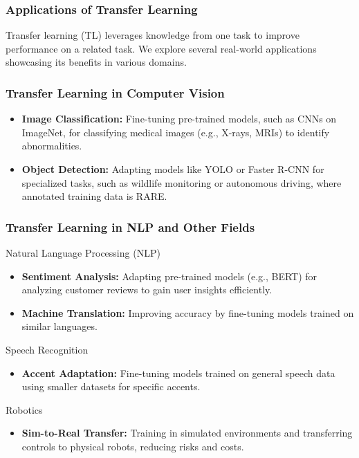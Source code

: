 \documentclass[aspectratio=169]{beamer}
\begin{document}
\begin{frame}[fragile]
    \frametitle{Applications of Transfer Learning}
    Transfer learning (TL) leverages knowledge from one task to improve performance on a related task. We explore several real-world applications showcasing its benefits in various domains.
\end{frame}

\begin{frame}[fragile]
    \frametitle{Transfer Learning in Computer Vision}
    \begin{itemize}
        \item \textbf{Image Classification:} Fine-tuning pre-trained models, such as CNNs on ImageNet, for classifying medical images (e.g., X-rays, MRIs) to identify abnormalities.
        \item \textbf{Object Detection:} Adapting models like YOLO or Faster R-CNN for specialized tasks, such as wildlife monitoring or autonomous driving, where annotated training data is RARE.
    \end{itemize}
\end{frame}

\begin{frame}[fragile]
    \frametitle{Transfer Learning in NLP and Other Fields}
    \begin{block}{Natural Language Processing (NLP)}
        \begin{itemize}
            \item \textbf{Sentiment Analysis:} Adapting pre-trained models (e.g., BERT) for analyzing customer reviews to gain user insights efficiently.
            \item \textbf{Machine Translation:} Improving accuracy by fine-tuning models trained on similar languages.
        \end{itemize}
    \end{block}
    
    \begin{block}{Speech Recognition}
        \begin{itemize}
            \item \textbf{Accent Adaptation:} Fine-tuning models trained on general speech data using smaller datasets for specific accents.
        \end{itemize}
    \end{block}
    
    \begin{block}{Robotics}
        \begin{itemize}
            \item \textbf{Sim-to-Real Transfer:} Training in simulated environments and transferring controls to physical robots, reducing risks and costs.
        \end{itemize}
    \end{block}
\end{frame}
\end{document}
